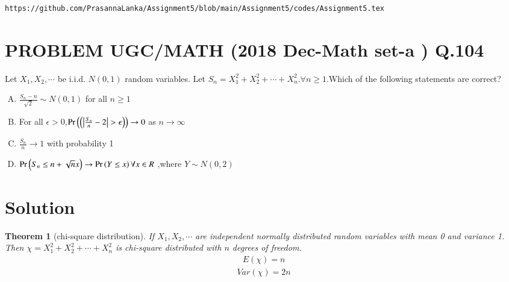 \documentclass[journal,12pt,twocolumn]{IEEEtran}
\newtheorem{theorem}{Theorem}[section]
\begin{document}
\begin{lstlisting}
https://github.com/PrasannaLanka/Assignment5/blob/main/Assignment5/codes/Assignment5.tex
\end{lstlisting}

\section*{PROBLEM UGC/MATH (2018 Dec-Math set-a ) Q.104}
Let $X_1,X_2, \cdots$ be i.i.d. $N(0,1)$ random variables. Let $S_{n}=X_{1}^2+X_{2}^2+\cdots+X_{n}^2.\forall n\geq 1. $Which of the following statements are correct?
\begin{enumerate}[(A)]
\setlength\itemsep{1em}
\item $\frac{S_{n}-n}{\sqrt{2}}\sim N(0,1)$ for all $n\geq 1$
\item For all $\epsilon > 0$,$\pr{\brak{\left|{\frac{S_n}{n}-2}\right|>\epsilon}}\to 0$ as $n \to \infty$
\item $\frac{S_{n}}{n} \to 1$ with probability 1
\item $\Pr\left(S_n \leq n+ \sqrt{n}x\right) \rightarrow \Pr\left(Y \leq x\right) \forall x \in R$ ,where $Y \sim N(0,2)$
\end{enumerate}




 \section*{Solution}
 
 \begin{theorem}[chi-square distribution]
If $X_1,X_2,\cdots$ are independent normally distributed random variables with mean 0 and variance 1. Then $\chi=X_{1}^2+X_{2}^2+\cdots+X_{n}^2$ is chi-square distributed with $n$ degrees of freedom.
\begin{align}
    E(\chi)=n \label{eq:x2}
\end{align}
\begin{align}
    Var(\chi)=2n\label{eq:x10}
\end{align}\label{lem}
\end{theorem}
\end{document}
